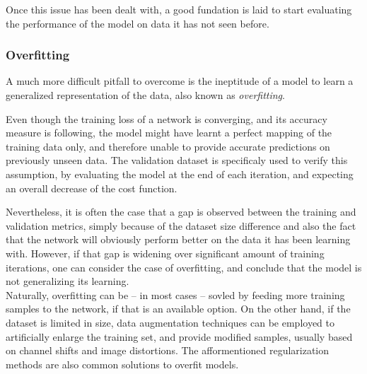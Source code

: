 Once this issue has been dealt with, a good fundation is laid to start
evaluating the performance of the model on data it has not seen before.

	\subsubsection{Overfitting}

A much more difficult pitfall to overcome is the ineptitude of a model to learn
a generalized representation of the data, also known as \emph{overfitting}.

Even though the training loss of a network is converging, and its accuracy
measure is following, the model might have learnt a perfect mapping of the
training data only, and therefore unable to provide accurate predictions on
previously unseen data. The validation dataset is specificaly used to verify
this assumption, by evaluating the model at the end of each iteration, and
expecting an overall decrease of the cost function.

Nevertheless, it is often the case that a gap is observed between the training
and validation metrics, simply because of the dataset size difference and also
the fact that the network will obviously perform better on the data it has been
learning with. However, if that gap is widening over significant amount of
training iterations, one can consider the case of overfitting, and conclude
that the model is not generalizing its learning.\\

Naturally, overfitting can be -- in most cases -- sovled by feeding more
training samples to the network, if that is an available option. On the other
hand, if the dataset is limited in size, data augmentation techniques can be
employed to artificially enlarge the training set, and provide modified
samples, usually based on channel shifts and image distortions. The
afformentioned regularization methods are also common solutions to overfit
models.
